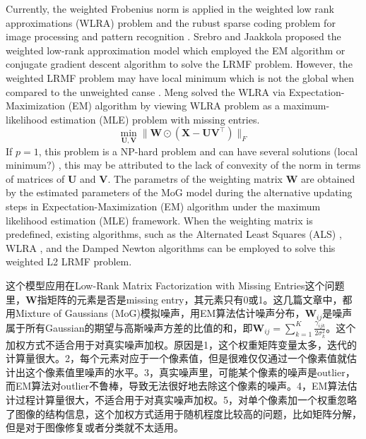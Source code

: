 \documentclass[10pt,twocolumn,letterpaper]{article}
\begin{document}
Currently, the weighted Frobenius norm is applied in the weighted low rank approximations (WLRA) problem \cite{srebro2003weighted} and the rubust sparse coding problem for image processing \cite{jiang2014mixed} and pattern recognition \cite{meng2013robust}. Srebro and Jaakkola \cite{srebro2003weighted} proposed the weighted low-rank approximation model which employed the EM algorithm or conjugate gradient descent algorithm to solve the LRMF problem. However, the weighted LRMF problem may have local minimum which is not the global when compared to the unweighted canse \cite{srebro2003weighted}. Meng \etal \cite{meng2013robust} solved the WLRA via Expectation-Maximization (EM) algorithm by viewing WLRA problem as a maximum-likelihood estimation (MLE) problem with missing entries. 
\begin{equation}
\min_{\mathbf{U},\mathbf{V}}\|\mathbf{W}\odot(\mathbf{X}-\mathbf{U}\mathbf{V}^{\top})\|_{F}
\end{equation}
If $p=1$, this problem is a NP-hard problem and can have several solutions (local minimum?) \cite{GillisGlineur}, this may be attributed to the lack of convexity of the norm in terms of matrices of $\mathbf{U}$ and $\mathbf{V}$. The parametrs of the weighting matrix $\mathbf{W}$ are obtained by the estimated parameters of the MoG model during the alternative updating steps in Expectation-Maximization (EM) algorithm under the maximum likelihood estimation (MLE) framework. When the weighting matrix is predefined, existing algorithms, such as the Alternated
Least Squares (ALS) \cite{de2003framework}, WLRA \cite{srebro2003weighted}, and the Damped Newton algorithms \cite{buchanan2005damped} can be employed to solve this weighted L2 LRMF problem. 

这个模型应用在Low-Rank Matrix Factorization with Missing Entries这个问题里，$\mathbf{W}$指矩阵的元素是否是missing entry，其元素只有0或1。这几篇文章中，都用Mixture of Gaussians (MoG)模拟噪声，用EM算法估计噪声分布，$\mathbf{W}_{ij}$是噪声属于所有Gaussian的期望与高斯噪声方差的比值的和，即$\mathbf{W}_{ij}=\sum_{k=1}^{K}\frac{\gamma_{ijk}}{2\sigma_{k}^{2}}$。这个加权方式不适合用于对真实噪声加权。原因是1，这个权重矩阵变量太多，迭代的计算量很大。2，每个元素对应于一个像素值，但是很难仅仅通过一个像素值就估计出这个像素值里噪声的水平。3，真实噪声里，可能某个像素的噪声是outlier，而EM算法对outlier不鲁棒，导致无法很好地去除这个像素的噪声。4，EM算法估计过程计算量很大，不适合用于对真实噪声加权。5，对单个像素加一个权重忽略了图像的结构信息，这个加权方式适用于随机程度比较高的问题，比如矩阵分解，但是对于图像修复或者分类就不太适用。
\end{document}
